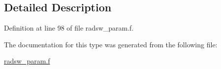 \subsection{Detailed Description}


Definition at line 98 of file radsw\+\_\+param.\+f.



The documentation for this type was generated from the following file\+:\begin{DoxyCompactItemize}
\item 
\hyperlink{radsw__param_8f}{radsw\+\_\+param.\+f}\end{DoxyCompactItemize}
